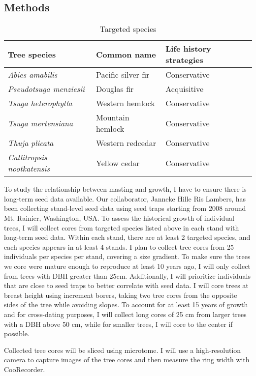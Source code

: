 \documentclass[11pt,letter]{article}
\begin{document}
\subsection{Methods}
\begin{table}[htb]
	\centering
	\small
	\caption{Targeted species}
\begin{tabular}{|p{5cm}|p{5cm}|p{5cm}|}
\hline
 Tree species & Common name & Life history strategies\\ \hline %
\textit{Abies amabilis} & Pacific silver fir & Conservative \\ \hline
\textit{Pseudotsuga menziesii} & Douglas fir & Acquisitive    \\\hline
\textit{Tsuga heterophylla} & Western hemlock & Conservative    \\\hline
\textit{Tsuga mertensiana} & Mountain hemlock & Conservative    \\\hline
\textit{Thuja plicata} & Western redcedar & Conservative    \\\hline
\textit{Callitropsis nootkatensis} & Yellow cedar & Conservative    \\\hline
\end{tabular}
\end{table}
To study the relationship between masting and growth, I have to ensure there is long-term seed data available. Our collaborator, Janneke Hille Ris Lambers, has been collecting stand-level seed data using seed traps starting from 2008 around Mt. Rainier, Washington, USA. To assess the historical growth of individual trees, I will collect cores from targeted species listed above in each stand with long-term seed data. Within each stand, there are at least 2 targeted species, and each species appears in at least 4 stands. I plan to collect tree cores from 25 individuals per species per stand, covering a size gradient. To make sure the trees we core were mature enough to reproduce at least 10 years ago, I will only collect from trees with DBH greater than 25cm. Additionally, I will prioritize individuals that are close to seed traps to better correlate with seed data. I will core trees at breast height using increment borers, taking two tree cores from the opposite sides of the tree while avoiding slopes. To account for at least 15 years of growth and for cross-dating purposes, I will collect long cores of 25 cm from larger trees with a DBH above 50 cm, while for smaller trees, I will core to the center if possible.

Collected tree cores will be sliced using microtome. I  will use a high-resolution camera to capture images of the tree cores and then measure the ring width with CooRecorder.
\end{document}

